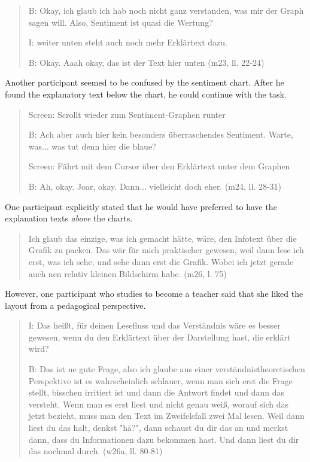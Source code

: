 \begin{quote}
    B: Okay, ich glaub ich hab noch nicht ganz verstanden, was mir der Graph sagen will. Also, Sentiment ist quasi die Wertung?

    I: weiter unten steht auch noch mehr Erklärtext dazu.

    B: Okay. Aaah okay, das ist der Text hier unten (m23, ll. 22-24)
\end{quote}

Another participant seemed to be confused by the sentiment chart. After he found the explanatory text below the chart, he could continue with the task.

\begin{quote}
    Screen: Scrollt wieder zum Sentiment-Graphen runter
    
    B: Ach aber auch hier kein besonders überraschendes Sentiment. Warte, was... was tut denn hier die blaue?

    Screen: Fährt mit dem Cursor über den Erklärtext unter dem Graphen
    
    B: Ah, okay. Joar, okay. Dann... vielleicht doch eher. (m24, ll. 28-31) 
\end{quote}

One participant explicitly stated that he would have preferred to have the explanation texts \emph{above} the charts.

\begin{quote}
    Ich glaub das einzige, was ich gemacht hätte, wäre, den Infotext über die Grafik zu packen. Das wär für mich praktischer gewesen, weil dann lese ich erst, was ich sehe, und sehe dann erst die Grafik. Wobei ich jetzt gerade auch nen relativ kleinen Bildschirm habe. (m26, l. 75)
\end{quote}

However, one participant who studies to become a teacher said that she liked the layout from a pedagogical perspective.

\begin{quote}
    I: Das heißt, für deinen Lesefluss und das Verständnis wäre es besser gewesen, wenn du den Erklärtext über der Darstellung hast, die erklärt wird?

    B: Das ist ne gute Frage, also ich glaube aus einer verständnistheoretischen Perspektive ist es wahrscheinlich schlauer, wenn man sich erst die Frage stellt, bisschen irritiert ist und dann die Antwort findet und dann das versteht. Wenn man es erst liest und nicht genau weiß, worauf sich das jetzt bezieht, muss man den Text im Zweifelsfall zwei Mal lesen. Weil dann liest du das halt, denkst "hä?", dann schaust du dir das an und merkst dann, dass du Informationen dazu bekommen hast. Und dann liest du dir das nochmal durch. (w26a, ll. 80-81)
\end{quote}

